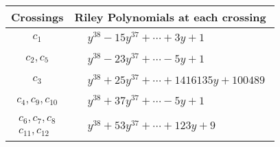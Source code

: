 \documentclass[1p]{elsarticle_modified}
\theoremstyle{definition}
\begin{document}
\begin{tabular}{m{50pt}|m{274pt}}
Crossings & \hspace{64pt}Riley Polynomials at each crossing \\
\hline $$\begin{aligned}c_{1}\end{aligned}$$&$\begin{aligned}
&y^{38}-15 y^{37}+\cdots+3 y+1
\end{aligned}$\\
\hline $$\begin{aligned}c_{2},c_{5}\end{aligned}$$&$\begin{aligned}
&y^{38}-23 y^{37}+\cdots-5 y+1
\end{aligned}$\\
\hline $$\begin{aligned}c_{3}\end{aligned}$$&$\begin{aligned}
&y^{38}+25 y^{37}+\cdots+1416135 y+100489
\end{aligned}$\\
\hline $$\begin{aligned}c_{4},c_{9},c_{10}\end{aligned}$$&$\begin{aligned}
&y^{38}+37 y^{37}+\cdots-5 y+1
\end{aligned}$\\
\hline $$\begin{aligned}c_{6},c_{7},c_{8}\\c_{11},c_{12}\end{aligned}$$&$\begin{aligned}
&y^{38}+53 y^{37}+\cdots+123 y+9
\end{aligned}$\\
\hline
\end{tabular}
\vskip 2pc
\end{document}
